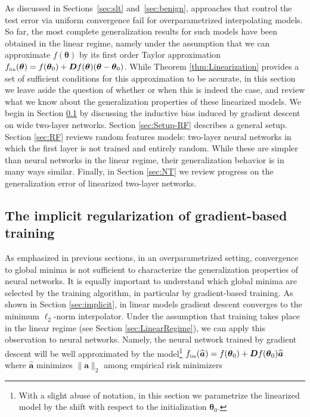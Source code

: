 As discussed in Sections~\ref{sec:slt} and~\ref{sec:benign}, approaches that control the test error via uniform convergence fail for overparametrized interpolating models. So far, the most complete generalization results for such models have  been obtained in the linear regime, namely under the assumption that we can approximate
$f({\boldsymbol \theta})$ by its first order Taylor approximation $f_{\mbox{\rm\tiny lin}}({\boldsymbol \theta}) = f({\boldsymbol \theta}_0)+{\boldsymbol D} f({\boldsymbol \theta})
({\boldsymbol \theta}-{\boldsymbol \theta}_0)$. 
While  Theorem \ref{thm:Linearization} provides a set of sufficient conditions for this approximation to be accurate, in this section we leave aside the question of whether or when this is indeed the case, and review what we know about the generalization properties of these linearized models. We begin in Section \ref{sec:BiasRF} by discussing the inductive bias induced by gradient descent on wide two-layer networks. Section \ref{sec:Setup-RF} describes a general setup. Section \ref{sec:RF} reviews random features models: two-layer neural networks in which the first layer is not trained and entirely random. While these are simpler than neural networks in the linear regime, their generalization behavior is in many ways similar. Finally, in Section \ref{sec:NT} we review progress on the generalization error of linearized two-layer networks.

\subsection{The  implicit regularization of gradient-based training}
\label{sec:BiasRF}

 As emphasized in previous sections, in an overparametrized setting,  convergence to global minima is not sufficient to characterize the generalization properties of neural networks. It is equally important to understand which global minima are selected by the training algorithm, in particular by gradient-based training. As shown in Section \ref{sec:implicit}, in linear models gradient descent converges to the minimum $\ell_2$-norm interpolator. Under the assumption that training takes place in the linear regime (see Section \ref{sec:LinearRegime}), we can apply this observation to neural networks. Namely, the neural network trained by gradient descent will be well approximated by the  model\footnote{With a slight abuse of notation, in this section we parametrize the linearized model by the shift with respect to the initialization ${\boldsymbol \theta}_0$.}
 $f_{\mbox{\rm\tiny lin}}({\widehat {\boldsymbol a}}) = f({\boldsymbol \theta}_0)+{\boldsymbol D} f({\boldsymbol \theta}_0){\widehat {\boldsymbol a}}$ where ${\widehat {\boldsymbol a}}$ minimizes
 $\|{\boldsymbol a}\|_2$  among empirical risk minimizers

